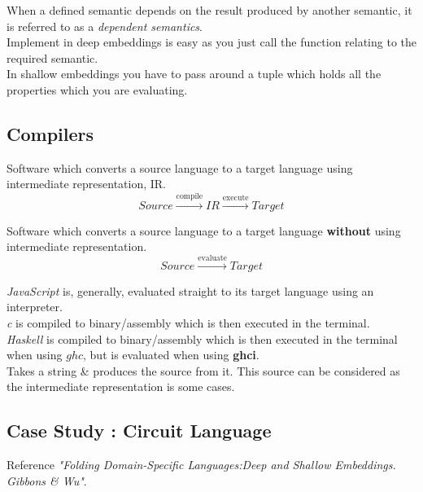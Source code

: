 \documentclass[11pt,a4paper]{article}
\begin{document}
When a defined semantic depends on the result produced by another semantic, it is referred to as a \textit{dependent semantics}.\\

Implement in deep embeddings is easy as you just call the function relating to the required semantic.\\
In shallow embeddings you have to pass around a tuple which holds all the properties which you are evaluating.\\

\subsection{Compilers}

Software which converts a source language to a target language using intermediate representation, IR.\\
$$Source \xrightarrow{\text{compile}} IR \xrightarrow{\text{execute}} Target$$

Software which converts a source language to a target language \textbf{without} using intermediate representation.\\
$$Source \xrightarrow{\text{evaluate}} Target$$

\textit{JavaScript} is, generally, evaluated straight to its target language using an interpreter.\\
\textit{c} is compiled to binary/assembly which is then executed in the terminal.\\
\textit{Haskell} is compiled to binary/assembly which is then executed in the terminal when using $ghc$, but is evaluated when using \textbf{ghci}.\\

Takes a string \& produces the source from it. This source can be considered as the intermediate representation is some cases.\\

\subsection{Case Study : Circuit Language}
Reference \textit{"Folding Domain-Specific Languages:Deep and Shallow Embeddings. Gibbons \& Wu"}.\\
\end{document}
